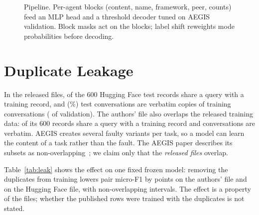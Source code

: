 \documentclass[conference]{IEEEtran}
\begin{document}
\begin{figure}[t]
\centering
{}
\caption{Pipeline. Per-agent blocks (content, name, framework, peer, counts) feed an MLP head and a threshold decoder tuned on AEGIS validation. Block masks act on the blocks; label shift reweights mode probabilities before decoding.}
\label{fig:pipe}
\end{figure}

\section{Duplicate Leakage}\label{sec:leak}
In the released files, \qTrain{} of the 600 Hugging Face test records share a query with a training record, and \dupTrain{} (\dupTrainPct\%) test conversations are verbatim copies of training conversations (\dupVal{} of validation). The authors' file also overlaps the released training data: \repoQTrain{} of its 600 records share a query with a training record and \repoDupTrain{} conversations are verbatim. AEGIS creates several faulty variants per task, so a model can learn the content of a task rather than the fault. The AEGIS paper describes its subsets as non-overlapping~\cite{aegis}; we claim only that the \emph{released files} overlap.

Table~\ref{tab:leak} shows the effect on one fixed frozen model: removing the duplicates from training lowers pair micro-F1 by \dropAE{} points on the authors' file and \dropHF{} on the Hugging Face file, with non-overlapping intervals. The effect is a property of the files; whether the published rows were trained with the duplicates is not stated.
\end{document}
